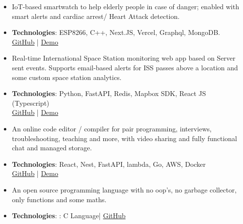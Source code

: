 
  

\begin{itemize}
\item IoT-based smartwatch to help elderly people in case of danger; enabled with smart alerts and cardiac arrest/
Heart Attack detection.
\item \textbf{Technologies}: ESP8266, C++, Next.JS, Vercel, Graphql, MongoDB.\\
\textcolor{blue}{\href{https://github.com/shaiq-dev/PanicAlarm}{GitHub}} | \textcolor{blue}{\href{https://panicalarm.vercel.app}{Demo}}
\end{itemize}
\smallskip
\smallskip

\begin{itemize}
\item Real-time International Space Station monitoring  web app based on Server sent events. Supports email-based alerts for ISS passes above a location and some custom space station analytics.
\item \textbf{Technologies}: Python, FastAPI, Redis, Mapbox SDK, React JS (Typescript)\\
\textcolor{blue}{\href{https://github.com/shaiq-dev/server4issnow}{GitHub}} | \textcolor{blue}{\href{https://issnow.netlify.app}{Demo}}
\end{itemize}
\smallskip
\smallskip

\begin{itemize}
\item An online code editor / compiler for pair programming, interviews, troubleshooting, teaching and more,  with video sharing and fully functional chat and managed storage.
\item \textbf{Technologies}: React, Nest, FastAPI, lambda, Go, AWS, Docker\\
\textcolor{blue}{\href{https://github.com/shaiq-dev/CodePair}{GitHub}} |
\textcolor{blue}{\href{https://codepair.vercel.app}{Demo}}
\end{itemize}
\smallskip
\smallskip

\begin{itemize}
\item An open source programming language with no oop's, no garbage collector, only functions and some maths.
\item \textbf{Technologies}: : C Language\hspace{2mm}|\hspace{2mm}
\textcolor{blue}{\href{https://github.com/shaiq-dev/Triod}{GitHub}}
\end{itemize}
\smallskip

